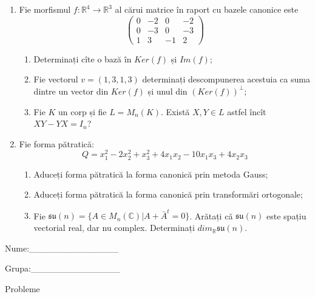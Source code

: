 \documentclass{article}
\begin{document}
\begin{enumerate}
 \item Fie morfismul $f:\mathbb{R}^4 \to \mathbb{R}^3$ al cărui matrice în raport cu bazele canonice este
$$\begin{pmatrix}
0&-2&0&-2\\
0&-3&0&-3\\
1&3&-1&2
\end{pmatrix}$$

\begin{enumerate}
\item Determinați cîte o bază în $Ker(f)$ și $Im(f)$;
\item Fie vectorul $v=(1,3,1,3)$ determinați descompunerea acestuia ca suma dintre un vector din $Ker(f)$ și unul din $(Ker(f))^\perp$;
\item Fie $K$ un corp și fie $L=M_n(K)$. Există $X,Y \in L$ astfel încît $XY-YX=I_n$?  
\end{enumerate}
\item Fie forma pătratică:
$$Q= x_1^2-2x_2^2+x_3^2+4x_1x_2-10x_1x_3+4x_2x_3$$

\begin{enumerate}
\item Aduceți forma pătratică la forma canonică prin metoda Gauss;
\item Aduceți forma pătratică la forma canonică prin transformări ortogonale;
\item Fie $\mathfrak{su}(n)=\{ A \in M_n(\mathbb{C}) | A+\bar{A}^t=0\}$. Arătați că $\mathfrak{su}(n)$ este spațiu vectorial real, dar nu complex.
Determinați $dim_{\mathbb{R}}\mathfrak{su}(n)$.
\end{enumerate}
\end{enumerate}
\newpage
\begin{flushright}
Nume:\_\_\_\_\_\_\_\_\_\_\_\_\_\_
 
 
Grupa:\_\_\_\_\_\_\_\_\_\_\_\_\_\_
\end{flushright}
\begin{center}
\vspace{2cm}
{\Large Probleme}
\vspace{2cm}
\end{center}
\end{document}
